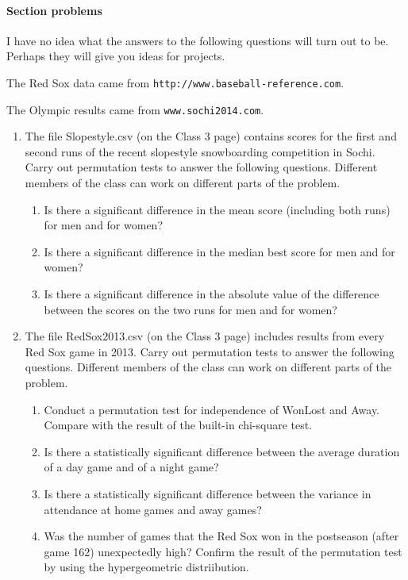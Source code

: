 \documentclass[12pt]{article}
\begin{document}
\pagebreak


\paragraph*{Section problems}

I have no idea what the answers to the following questions will turn out to be. Perhaps they will give you ideas for projects.

The Red Sox data came from {\tt http://www.baseball-reference.com}.

The Olympic results came from {\tt www.sochi2014.com}.

\begin{enumerate}



\item The file Slopestyle.csv (on the Class 3 page) contains scores for the first and second runs of the recent slopestyle snowboarding competition in Sochi. Carry out permutation tests to answer the following questions. Different members of the class can work on different parts of the problem.
\begin{enumerate}
\item Is there a significant difference in the mean score (including both runs) for men and for women?
\item Is there a significant difference in the median best score for men and for women?
\item Is there a significant difference in the absolute value of the difference between the scores on the two runs for men and for women?

\end{enumerate}

\item The file RedSox2013.csv (on the Class 3 page) includes results from every Red Sox game in 2013. Carry out permutation tests to answer the following questions. Different members of the class can work on different parts of the problem.
\begin{enumerate}
\item Conduct a permutation test for independence of WonLost and Away. Compare with the result of the built-in chi-square test.
\item Is there a statistically significant difference between the average duration of a day game and of a night game?
\item Is there a statistically significant difference between the variance in attendance at home games and away games?
\item Was the number of games that the Red Sox won in the postseason (after game 162) unexpectedly high? Confirm the result of the permutation test by using the hypergeometric distriibution.

\end{enumerate}

\end{enumerate}
\end{document}
